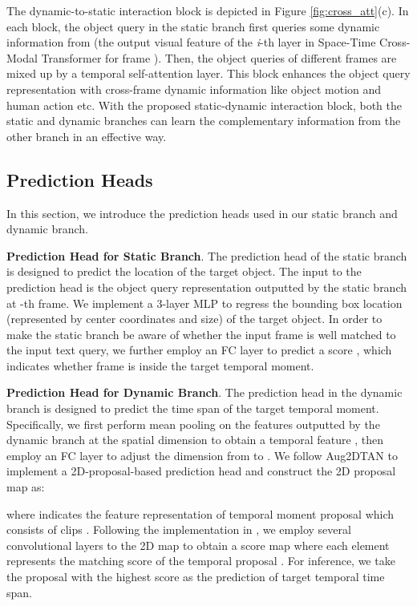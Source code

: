 \documentclass[sigconf]{acmart}
\begin{document}
The dynamic-to-static interaction block is depicted in Figure \ref{fig:cross_att}(c). In each block, the object query  in the static branch first queries some dynamic information from  (the output visual feature of the \emph{i}-th layer in Space-Time Cross-Modal Transformer for frame ). Then, the object queries of different frames are mixed up by a temporal self-attention layer. This block enhances the object query representation with cross-frame dynamic information like object motion and human action etc. With the proposed static-dynamic interaction block, both the static and dynamic branches can learn the complementary information from the other branch in an effective way.

\subsection{Prediction Heads}
In this section, we introduce the prediction heads used in our static branch and dynamic branch.

\noindent\textbf{Prediction Head for Static Branch}. The prediction head of the static branch is designed to predict the location of the target object. The input to the prediction head is the object query representation  outputted by the static branch at -th frame. We implement a 3-layer MLP to regress the bounding box location (represented by center coordinates and size)  of the target object. In order to make the static branch be aware of whether the input frame is well matched to the input text query, we further employ an FC layer to predict a score , which indicates whether frame  is inside the target temporal moment.

\noindent\textbf{Prediction Head for Dynamic Branch}. The prediction head in the dynamic branch is designed to predict the time span of the target temporal moment. Specifically, we first perform mean pooling on the features outputted by the dynamic branch at the spatial dimension to obtain a temporal feature , then employ an FC layer to adjust the dimension from  to . We follow Aug2DTAN\cite{Aug2dTAN} to implement a 2D-proposal-based prediction head and construct the 2D proposal map  as:

where  indicates the feature representation of temporal moment proposal  which consists of clips . Following the implementation in \cite{Aug2dTAN}, we employ several convolutional layers to the 2D map  to obtain a score map  where each element  represents the matching score of the temporal proposal . For inference, we take the proposal with the highest score as the prediction of target temporal time span.
\end{document}
